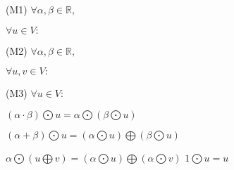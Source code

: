 {\vskip12pt
\hskip6pt
\begin{minipage}[t]{0.36 \columnwidth}
\parskip8pt
(M1) $\forall \alpha, \beta \in \mathbb{R},$ \par \vspace{-4pt}
\hskip17pt $\forall u \in V:$ \par
(M2) $\forall \alpha, \beta \in \mathbb{R},$ \par \vspace{-4pt}
\hskip17pt $\forall u, v \in V:$ \par
(M3) $\forall u \in V:$
\end{minipage}
\begin{minipage}[t]{0.6 \columnwidth}
\parskip8pt
$(\alpha \cdot \beta) \bigodot u = \alpha \bigodot (\beta \bigodot u)$ \par \vskip12pt
$(\alpha + \beta) \bigodot u = (\alpha \bigodot u) \bigoplus (\beta \bigodot u)$ \par \vskip-4pt
$\alpha \bigodot (u \bigoplus v) = (\alpha \bigodot u) \bigoplus (\alpha \bigodot v)$
\vskip0pt
$1 \bigodot u = u$

\end{minipage}

}
\WhiteSpace